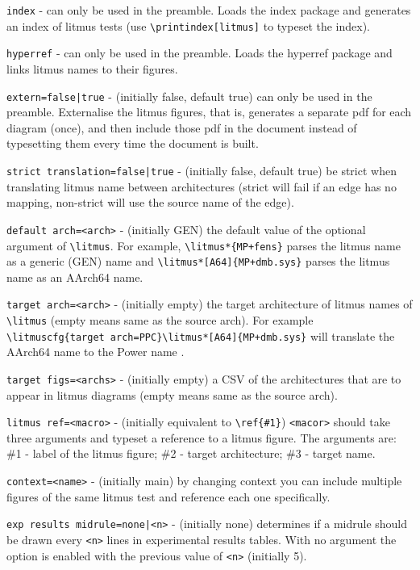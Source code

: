 \documentclass[a4paper]{article}
\begin{document}
\verb|index| - can only be used in the preamble. Loads the index
package and generates an index of litmus tests (use
\verb|\printindex[litmus]| to typeset the index).

\verb|hyperref| - can only be used in the preamble. Loads the hyperref
package and links litmus names to their figures.

\verb!extern=false|true! - (initially false, default true) can only be
used in the preamble. Externalise the litmus figures, that is,
generates a separate pdf for each diagram (once), and then include
those pdf in the document instead of typesetting them every time the
document is built.

\verb!strict translation=false|true! - (initially false, default true)
be strict when translating litmus name between architectures (strict
will fail if an edge has no mapping, non-strict will use the source
name of the edge).

\verb|default arch=<arch>| - (initially GEN) the default value of the
optional argument of \verb|\litmus|.
For example, \verb|\litmus*{MP+fens}| parses the litmus name as a
generic (GEN) name and \verb|\litmus*[A64]{MP+dmb.sys}| parses the
litmus name as an AArch64 name.

\verb|target arch=<arch>| - (initially empty) the target architecture
of litmus names of \verb|\litmus| (empty means same as the source arch).
For example
\verb|\litmuscfg{target arch=PPC}\litmus*[A64]{MP+dmb.sys}|
will translate the AArch64 name  to the
Power name .

\verb|target figs=<archs>| - (initially empty) a CSV of the architectures
that are to appear in litmus diagrams (empty means same as the source arch).

\verb|litmus ref=<macro>| - (initially equivalent to \verb|\ref{#1}|)
\verb|<macor>| should take three arguments and typeset a reference to
a litmus figure. The arguments are: \#1 - label of the litmus figure;
\#2 - target architecture; \#3 - target name.

\verb|context=<name>| - (initially main) by changing context you can
include multiple figures of the same litmus test and reference each
one specifically.

\verb!exp results midrule=none|<n>! - (initially none) determines if a
midrule should be drawn every \verb|<n>| lines in experimental results
tables.
With no argument the option is enabled with the previous value of
\verb|<n>| (initially 5).
\end{document}
